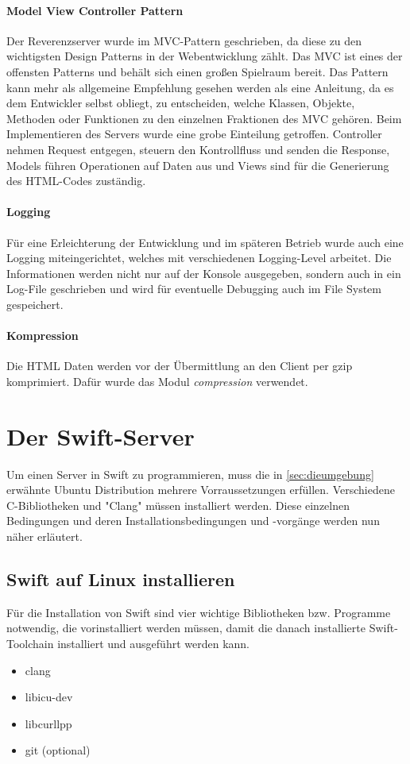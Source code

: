 \paragraph{Model View Controller Pattern}
Der Reverenzserver wurde im MVC-Pattern geschrieben, da diese zu den wichtigsten Design Patterns in der Webentwicklung zählt. Das MVC ist eines der offensten Patterns und behält sich einen großen Spielraum bereit. Das Pattern kann mehr als allgemeine Empfehlung gesehen werden als eine Anleitung, da es dem Entwickler selbst obliegt, zu entscheiden, welche Klassen, Objekte, Methoden oder Funktionen zu den einzelnen Fraktionen des MVC gehören. Beim Implementieren des Servers wurde eine grobe Einteilung getroffen. Controller nehmen Request entgegen, steuern den Kontrollfluss und senden die Response, Models führen Operationen auf Daten aus und Views sind für die Generierung des HTML-Codes zuständig.

\paragraph{Logging}
Für eine Erleichterung der Entwicklung und im späteren Betrieb wurde auch eine Logging miteingerichtet, welches mit verschiedenen Logging-Level arbeitet. Die Informationen werden nicht nur auf der Konsole ausgegeben, sondern auch in ein Log-File geschrieben und wird für eventuelle Debugging auch im File System gespeichert.

\paragraph{Kompression}
Die HTML Daten werden vor der Übermittlung an den Client per gzip komprimiert. Dafür wurde das Modul \textit{compression} verwendet.

\section{Der Swift-Server}
\label{sec:derswiftserver}
Um einen Server in Swift zu programmieren, muss die in \ref{sec:dieumgebung} erwähnte Ubuntu Distribution mehrere Vorraussetzungen erfüllen. Verschiedene C-Bibliotheken und "Clang" müssen installiert werden. Diese einzelnen Bedingungen und deren Installationsbedingungen und -vorgänge werden nun näher erläutert.

\subsection{Swift auf Linux installieren}
Für die Installation von Swift sind vier wichtige Bibliotheken bzw. Programme notwendig, die vorinstalliert werden müssen, damit die danach installierte Swift-Toolchain installiert und ausgeführt werden kann. 
\begin{itemize}
	\item clang
	\item libicu-dev
	\item libcurllpp
	\item git (optional)
\end{itemize}

